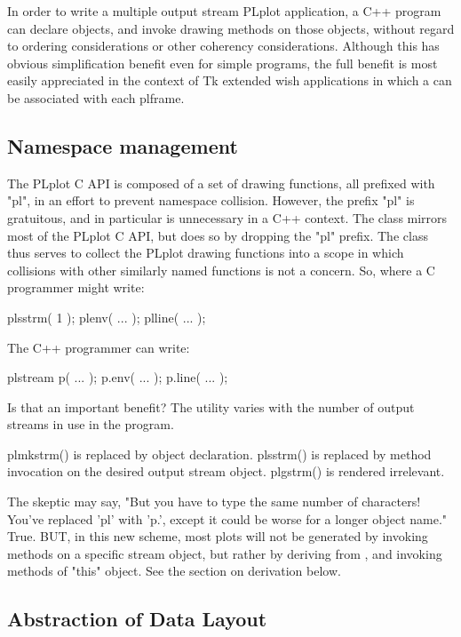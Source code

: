 In order to write a multiple output stream PLplot application, a C++
program can declare  objects, and invoke drawing methods on
those objects, without regard to ordering considerations or other
coherency considerations.  Although this has obvious simplification
benefit even for simple programs, the full benefit is most easily
appreciated in the context of Tk extended wish applications in which a
 can be associated with each plframe.

\subsection{Namespace management}

The PLplot C API is composed of a set of drawing functions, all
prefixed with "pl", in an effort to prevent namespace collision.
However, the prefix "pl" is gratuitous, and in particular is
unnecessary in a C++ context.  The  class mirrors most
of the PLplot C API, but does so by dropping the "pl" prefix.  The
 class thus serves to collect the PLplot drawing
functions into a scope in which collisions with other similarly named
functions is not a concern.  So, where a C programmer might write:
\begin{example}
	plsstrm( 1 );
	plenv( ... );
	plline( ... );
\end{example}
The C++ programmer can write:
\begin{example}
	plstream p( ... );
	p.env( ... );
	p.line( ... );
\end{example}

Is that an important benefit?  The utility varies with the number of
output streams in use in the program.

plmkstrm() is replaced by object declaration.  plsstrm() is replaced by
method invocation on the desired output stream object.  plgstrm() is
rendered irrelevant.

The skeptic may say, "But you have to type the same number of
characters!  You've replaced 'pl' with 'p.', except it could be worse
for a longer object name."  True.  BUT, in this new scheme, most plots
will not be generated by invoking methods on a specific stream object,
but rather by deriving from , and invoking methods of
"this" object.  See the section on derivation below.

\subsection{Abstraction of Data Layout}

